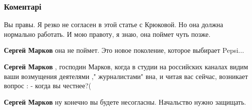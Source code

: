  
 
 
 
 
\subsubsection{Коментарі}
\label{sec:18_07_2021.fb.guzhva_igor.1.svetlana.cmt}

\begin{itemize}
 

Вы правы. Я резко не согласен в этой статье с Крюковой. Но она должна нормально
работать. И мою правоту, я знаю, она поймет чуть позже.

\begin{itemize}
 
\textbf{Сергей Марков} она не поймет. Это новое поколение, которое выбирает Pepsi...

 
\textbf{Сергей Марков} , господин Марков, когда в студии на российских каналах видим ваши возмущения деятелями ," журналистами" вна, и читая вас сейчас, возникает вопрос : - когда вы честнее?(

 
\textbf{Сергей Марков} ну конечно вы будете несогласны. Начальство нужно защищать.
\end{itemize}


\end{itemize}
